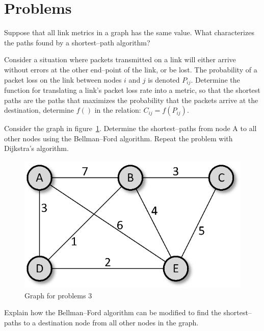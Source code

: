 \section{Problems}

\begin{problem}{1}
Suppose that all link metrics in a graph has the same value. What
characterizes the paths found by a shortest--path algorithm?
\end{problem}

\begin{problem}{2}
Consider a situation where packets transmitted on a link will
either arrive without errors at the other end--point of the link,
or be lost. The probability of a packet loss on the link between
nodes $i$ and $j$ is denoted $P_{ij}$. Determine the function for
translating a link's packet loss rate into a metric, so that the
shortest paths are the paths that maximizes the probability that
the packets arrive at the destination, \ie determine $f()$ in the
relation: $C_{ij} = f(P_{ij})$.
\end{problem}

\begin{problem}{3}
Consider the graph in figure~\ref{fig:graphs2}. Determine the
shortest--paths from node A to all other nodes using the
Bellman--Ford algorithm. Repeat the problem with Dijkstra's
algorithm.
\begin{figure}[ht] \centering
\includegraphics{graphs2.eps}
\caption{\label{fig:graphs2}Graph for problems 3}
\end{figure}
\end{problem}

\begin{problem}{4}
Explain how the Bellman--Ford algorithm can be modified to find
the shortest--paths to a destination node from all other nodes in
the graph.
\end{problem}
